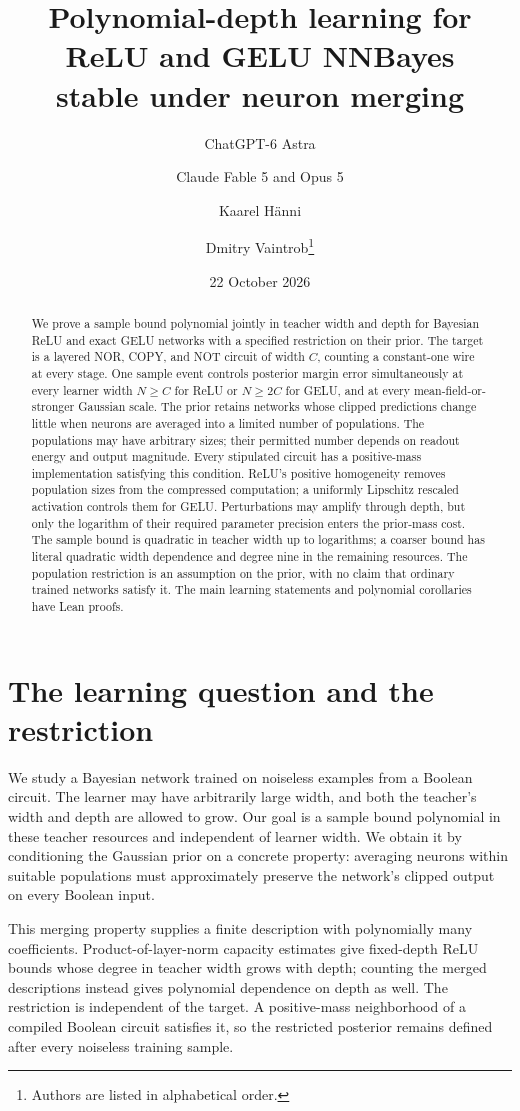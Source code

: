 \documentclass[11pt]{article}
\title{Polynomial-depth learning for ReLU and GELU NNBayes\\stable under neuron merging}
\author{ChatGPT-6 Astra \and Claude Fable 5 and Opus 5 \and Kaarel H\"anni \and Dmitry Vaintrob\thanks{Authors are listed in alphabetical order.}}
\date{22 October 2026}
\begin{document}
\maketitle
\begin{abstract}
We prove a sample bound polynomial jointly in teacher width and depth for Bayesian ReLU and exact GELU networks with a specified restriction on their prior. The target is a layered NOR, COPY, and NOT circuit of width $C$, counting a constant-one wire at every stage. One sample event controls posterior margin error simultaneously at every learner width $N\ge C$ for ReLU or $N\ge2C$ for GELU, and at every mean-field-or-stronger Gaussian scale. The prior retains networks whose clipped predictions change little when neurons are averaged into a limited number of populations. The populations may have arbitrary sizes; their permitted number depends on readout energy and output magnitude. Every stipulated circuit has a positive-mass implementation satisfying this condition. ReLU's positive homogeneity removes population sizes from the compressed computation; a uniformly Lipschitz rescaled activation controls them for GELU. Perturbations may amplify through depth, but only the logarithm of their required parameter precision enters the prior-mass cost. The sample bound is quadratic in teacher width up to logarithms; a coarser bound has literal quadratic width dependence and degree nine in the remaining resources. The population restriction is an assumption on the prior, with no claim that ordinary trained networks satisfy it. The main learning statements and polynomial corollaries have Lean proofs.
\end{abstract}

\section{The learning question and the restriction}
We study a Bayesian network trained on noiseless examples from a Boolean circuit. The learner may have arbitrarily large width, and both the teacher's width and depth are allowed to grow. Our goal is a sample bound polynomial in these teacher resources and independent of learner width. We obtain it by conditioning the Gaussian prior on a concrete property: averaging neurons within suitable populations must approximately preserve the network's clipped output on every Boolean input.

This merging property supplies a finite description with polynomially many coefficients. Product-of-layer-norm capacity estimates give fixed-depth ReLU bounds whose degree in teacher width grows with depth; counting the merged descriptions instead gives polynomial dependence on depth as well. The restriction is independent of the target. A positive-mass neighborhood of a compiled Boolean circuit satisfies it, so the restricted posterior remains defined after every noiseless training sample.
\end{document}
